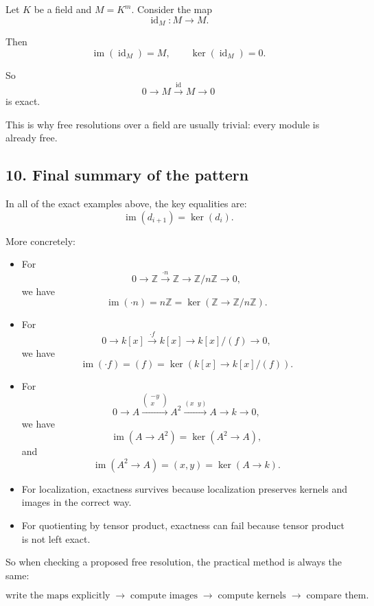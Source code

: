 \documentclass[12pt,a4paper]{article}
\theoremstyle{notespace}
\theoremstyle{definition}
\begin{document}
Let \(K\) be a field and \(M=K^m\). Consider the map
\[
\operatorname{id}_M:M\to M.
\]

Then
\[
\operatorname{im}(\operatorname{id}_M)=M,
\qquad
\ker(\operatorname{id}_M)=0.
\]

So
\[
0 \longrightarrow M \xrightarrow{\operatorname{id}} M \longrightarrow 0
\]
is exact.

This is why free resolutions over a field are usually trivial: every module is already free.

\bigskip

\subsection{10. Final summary of the pattern}

In all of the exact examples above, the key equalities are:
\[
\operatorname{im}(d_{i+1})=\ker(d_i).
\]

More concretely:

\begin{itemize}
	\item For
	\[
	0\to \mathbb Z \xrightarrow{\cdot n} \mathbb Z \to \mathbb Z/n\mathbb Z\to 0,
	\]
	we have
	\[
	\operatorname{im}(\cdot n)=n\mathbb Z=\ker(\mathbb Z\to \mathbb Z/n\mathbb Z).
	\]
	
	\item For
	\[
	0\to k[x]\xrightarrow{\cdot f}k[x]\to k[x]/(f)\to 0,
	\]
	we have
	\[
	\operatorname{im}(\cdot f)=(f)=\ker(k[x]\to k[x]/(f)).
	\]
	
	\item For
	\[
	0\to A\xrightarrow{\begin{pmatrix}-y\\x\end{pmatrix}}A^2\xrightarrow{(x\;\;y)}A\to k\to 0,
	\]
	we have
	\[
	\operatorname{im}(A\to A^2)=\ker(A^2\to A),
	\]
	and
	\[
	\operatorname{im}(A^2\to A)=(x,y)=\ker(A\to k).
	\]
	
	\item For localization, exactness survives because localization preserves kernels and images in the correct way.
	
	\item For quotienting by tensor product, exactness can fail because tensor product is not left exact.
\end{itemize}

So when checking a proposed free resolution, the practical method is always the same:

\[
\text{write the maps explicitly} \;\to\; \text{compute images} \;\to\; \text{compute kernels} \;\to\; \text{compare them}.
\]
\end{document}
